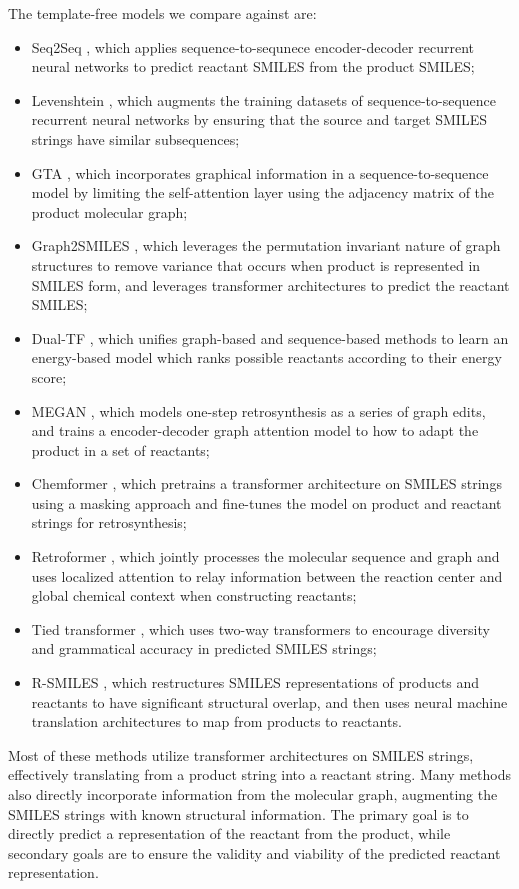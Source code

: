 \documentclass{article}
\begin{document}
The template-free models we compare against are:
\begin{itemize}
    \item Seq2Seq \cite{liu2017retrosynthetic}, which applies sequence-to-sequnece encoder-decoder recurrent neural networks to predict reactant SMILES from the product SMILES;
    \item Levenshtein \cite{sumner2020levenshtein}, which augments the training datasets of sequence-to-sequence recurrent neural networks by ensuring that the source and target SMILES strings have similar subsequences;
    \item GTA \cite{seo2021gta}, which incorporates graphical information in a sequence-to-sequence model by limiting the self-attention layer using the adjacency matrix of the product molecular graph; 
    \item Graph2SMILES \cite{tu2022permutation}, which leverages the permutation invariant nature of graph structures to remove variance that occurs when product is represented in SMILES form, and leverages transformer architectures to predict the reactant SMILES;
    \item Dual-TF \cite{sun2021towards}, which unifies graph-based and sequence-based methods to learn an energy-based model which ranks possible reactants according to their energy score;
    \item MEGAN \cite{sacha2021molecule}, which models one-step retrosynthesis as a series of graph edits, and trains a encoder-decoder graph attention model to how to adapt the product in a set of reactants;
    \item Chemformer \cite{irwin2022chemformer}, which pretrains a transformer architecture on SMILES strings using a masking approach and fine-tunes the model on product and reactant strings for retrosynthesis;
    \item Retroformer \cite{wan2022retroformer}, which jointly processes the molecular sequence and graph and uses localized attention to relay information between the reaction center and global chemical context when constructing reactants;
    \item Tied transformer \cite{kim2021valid}, which uses two-way transformers to encourage diversity and grammatical accuracy in predicted SMILES strings;
    \item R-SMILES \cite{zhong2022root}, which restructures SMILES representations of products and reactants to have significant structural overlap, and then uses neural machine translation architectures to map from products to reactants.
\end{itemize}
Most of these methods utilize transformer architectures on SMILES strings, effectively translating from a product string into a reactant string. Many methods also directly incorporate information from the molecular graph, augmenting the SMILES strings with known structural information. The primary goal is to directly predict a representation of the reactant from the product, while secondary goals are to ensure the validity and viability of the predicted reactant representation.
\end{document}
